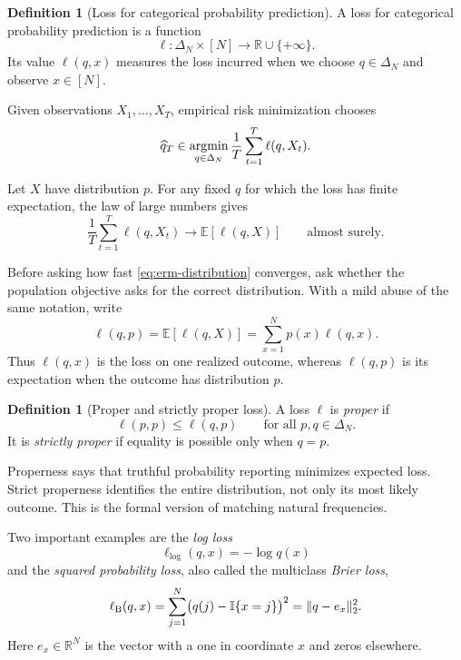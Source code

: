 \documentclass[11pt,twoside]{article}
\newcommand{\I}{\mathbb I}
\newcommand{\R}{\mathbb R}
\theoremstyle{definition}
\newtheorem{definition}[theorem]{Definition}
\theoremstyle{remark}
\begin{document}
\begin{definition}[Loss for categorical probability prediction]
\label{def:probability-loss}
A loss for categorical probability prediction is a function
\begin{equation}
\ell:\Delta_N\times[N]\to\R\cup\{+\infty\}.
\label{eq:loss-definition}
\end{equation}
Its value $\ell(q,x)$ measures the loss incurred when we choose
$q\in\Delta_N$ and observe $x\in[N]$.
\end{definition}

Given observations $X_1,\ldots,X_T$, empirical risk minimization chooses
\begin{equation}
\widehat q_T
\in\mathop{\rm argmin}_{q\in\Delta_N}
\frac1T\sum_{t=1}^T\ell(q,X_t).
\label{eq:erm-distribution}
\end{equation}

Let $X$ have distribution $p$. For any fixed $q$ for which the loss has finite
expectation, the law of large numbers gives
\begin{equation}
\frac1T\sum_{t=1}^T\ell(q,X_t)
\longrightarrow
\mathbb E[\ell(q,X)]
\qquad\text{almost surely}.
\label{eq:loss-lln}
\end{equation}

Before asking how fast \cref{eq:erm-distribution} converges, ask whether the
population objective asks for the correct distribution. With a mild abuse of
the same notation, write
\begin{equation}
\ell(q,p)
=\mathbb E[\ell(q,X)]
=\sum_{x=1}^N p(x)\ell(q,x).
\label{eq:population-loss}
\end{equation}
Thus $\ell(q,x)$ is the loss on one realized outcome, whereas $\ell(q,p)$ is
its expectation when the outcome has distribution $p$.

\begin{definition}[Proper and strictly proper loss]
\label{def:proper-loss}
A loss $\ell$ is \emph{proper} if
\[
\ell(p,p)\le \ell(q,p)
\qquad\text{for all }p,q\in\Delta_N.
\]
It is \emph{strictly proper} if equality is possible only when $q=p$.
\end{definition}

Properness says that truthful probability reporting minimizes expected loss.
Strict properness identifies the entire distribution, not only its most likely
outcome. This is the formal version of matching natural frequencies.

Two important examples are the \emph{log loss}
\begin{equation}
\ell_{\log}(q,x)=-\log q(x)
\label{eq:log-loss}
\end{equation}
and the \emph{squared probability loss}, also called the multiclass
\emph{Brier loss},
\begin{equation}
\ell_{\rm B}(q,x)
=\sum_{j=1}^N\bigl(q(j)-\I\{x=j\}\bigr)^2
=\lVert q-e_x\rVert_2^2.
\label{eq:brier-loss}
\end{equation}
Here $e_x\in\R^N$ is the vector with a one in coordinate $x$ and zeros
elsewhere.
\end{document}
